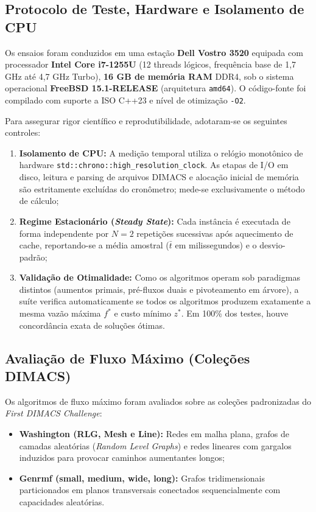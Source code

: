 \documentclass[12pt,a4paper]{article}
\begin{document}
\subsection{Protocolo de Teste, Hardware e Isolamento de CPU}

Os ensaios foram conduzidos em uma estação \textbf{Dell Vostro 3520} equipada com processador \textbf{Intel Core i7-1255U} (12 threads lógicos, frequência base de 1,7 GHz até 4,7 GHz Turbo), \textbf{16 GB de memória RAM} DDR4, sob o sistema operacional \textbf{FreeBSD 15.1-RELEASE} (arquitetura \texttt{amd64}). O código-fonte foi compilado com suporte a ISO C++23 e nível de otimização \lstinline{-O2}.

Para assegurar rigor científico e reprodutibilidade, adotaram-se os seguintes controles:
\begin{enumerate}[leftmargin=1.5em, itemsep=0.15em, topsep=0.2em, parsep=0em]
    \item \textbf{Isolamento de CPU:} A medição temporal utiliza o relógio monotônico de hardware \lstinline{std::chrono::high_resolution_clock}. As etapas de I/O em disco, leitura e parsing de arquivos DIMACS e alocação inicial de memória são estritamente excluídas do cronômetro; mede-se exclusivamente o método de cálculo;
    \item \textbf{Regime Estacionário (\textit{Steady State}):} Cada instância é executada de forma independente por $N = 2$ repetições sucessivas após aquecimento de cache, reportando-se a média amostral ($\bar{t}$ em milissegundos) e o desvio-padrão;
    \item \textbf{Validação de Otimalidade:} Como os algoritmos operam sob paradigmas distintos (aumentos primais, pré-fluxos duais e pivoteamento em árvore), a suíte verifica automaticamente se todos os algoritmos produzem exatamente a mesma vazão máxima $f^*$ e custo mínimo $z^*$. Em 100\% dos testes, houve concordância exata de soluções ótimas.
\end{enumerate}

\subsection{Avaliação de Fluxo Máximo (Coleções DIMACS)}

Os algoritmos de fluxo máximo foram avaliados sobre as coleções padronizadas do \textit{First DIMACS Challenge}:
\begin{itemize}[leftmargin=1.5em, itemsep=0.15em, topsep=0.2em, parsep=0em]
    \item \textbf{Washington (RLG, Mesh e Line):} Redes em malha plana, grafos de camadas aleatórias (\textit{Random Level Graphs}) e redes lineares com gargalos induzidos para provocar caminhos aumentantes longos;
    \item \textbf{Genrmf (small, medium, wide, long):} Grafos tridimensionais particionados em planos transversais conectados sequencialmente com capacidades aleatórias.
\end{itemize}
\end{document}
